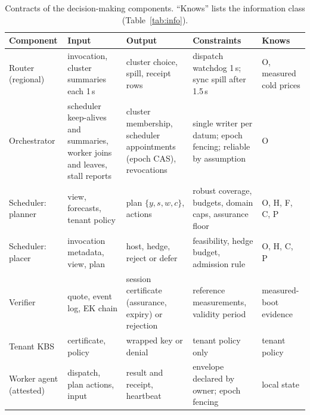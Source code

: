 \begin{table}[t]
\caption{Contracts of the decision-making components. ``Knows'' lists the information class (Table~\ref{tab:info}).}
\label{tab:contracts}
\centering\scriptsize
\setlength{\tabcolsep}{3pt}
\begin{tabular}{@{}p{1.9cm}p{4.0cm}p{3.6cm}p{4.2cm}p{3.3cm}@{}}
\toprule
Component & Input & Output & Constraints & Knows \\
\midrule
Router (regional) & invocation, cluster summaries each 1\,s & cluster choice, spill, receipt rows & dispatch watchdog 1\,s; sync spill after 1.5\,s & O, measured cold prices \\
Orchestrator & scheduler keep-alives and summaries, worker joins and leaves, stall reports & cluster membership, scheduler appointments (epoch CAS), revocations & single writer per datum; epoch fencing; reliable by assumption & O \\
Scheduler: planner & view, forecasts, tenant policy & plan $\{y,s,w,c\}$, actions & robust coverage, budgets, domain caps, assurance floor & O, H, F, C, P \\
Scheduler: placer & invocation metadata, view, plan & host, hedge, reject or defer & feasibility, hedge budget, admission rule & O, H, C, P \\
Verifier & quote, event log, EK chain & session certificate (assurance, expiry) or rejection & reference measurements, validity period & measured-boot evidence \\
Tenant KBS & certificate, policy & wrapped key or denial & tenant policy only & tenant policy \\
Worker agent (attested) & dispatch, plan actions, input & result and receipt, heartbeat & envelope declared by owner; epoch fencing & local state \\
\bottomrule
\end{tabular}
\end{table}
